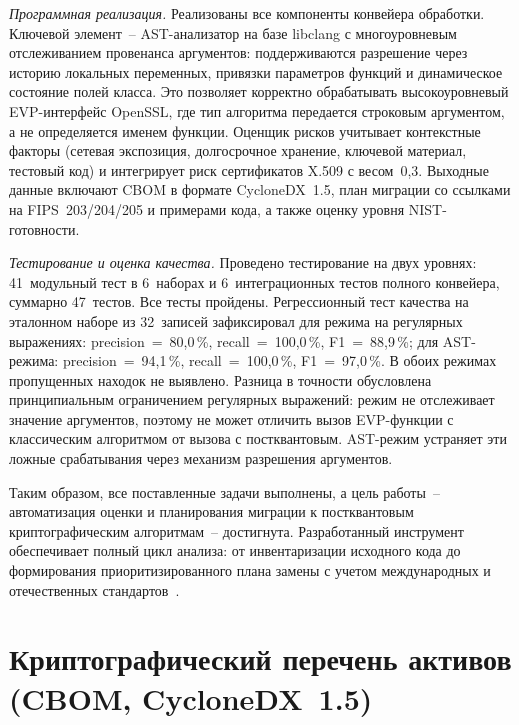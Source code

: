 \documentclass{itmo-vkr}
\begin{document}
\textit{Программная реализация.} Реализованы все компоненты конвейера обработки. Ключевой элемент~-- AST-анализатор на базе libclang с многоуровневым отслеживанием провенанса аргументов: поддерживаются разрешение через историю локальных переменных, привязки параметров функций и динамическое состояние полей класса. Это позволяет корректно обрабатывать высокоуровневый EVP-интерфейс OpenSSL, где тип алгоритма передается строковым аргументом, а не определяется именем функции. Оценщик рисков учитывает контекстные факторы (сетевая экспозиция, долгосрочное хранение, ключевой материал, тестовый код) и интегрирует риск сертификатов X.509 с весом~0,3. Выходные данные включают CBOM в формате CycloneDX~1.5, план миграции со ссылками на FIPS~203/204/205 и примерами кода, а также оценку уровня NIST-готовности.

\textit{Тестирование и оценка качества.} Проведено тестирование на двух уровнях: 41~модульный тест в 6~наборах и 6~интеграционных тестов полного конвейера, суммарно 47~тестов. Все тесты пройдены. Регрессионный тест качества на эталонном наборе из 32~записей зафиксировал для режима на регулярных выражениях: precision~=~80,0\,\%, recall~=~100,0\,\%, F1~=~88,9\,\%; для AST-режима: precision~=~94,1\,\%, recall~=~100,0\,\%, F1~=~97,0\,\%. В обоих режимах пропущенных находок не выявлено. Разница в точности обусловлена принципиальным ограничением регулярных выражений: режим не отслеживает значение аргументов, поэтому не может отличить вызов EVP-функции с классическим алгоритмом от вызова с постквантовым. AST-режим устраняет эти ложные срабатывания через механизм разрешения аргументов.

Таким образом, все поставленные задачи выполнены, а цель работы~-- автоматизация оценки и планирования миграции к постквантовым криптографическим алгоритмам~-- достигнута. Разработанный инструмент обеспечивает полный цикл анализа: от инвентаризации исходного кода до формирования приоритизированного плана замены с учетом международных и отечественных стандартов~\cite{pqc-tool-github}.

	\printbibliography

\appendix

\section[Криптографический перечень активов]{Криптографический перечень активов (CBOM, CycloneDX~1.5)}
\label{app:cbom}
\end{document}
